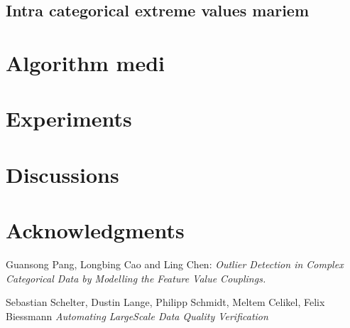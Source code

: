 \documentclass{article}
\begin{document}

\subsection{Intra categorical extreme values mariem} %
\label{sub:Intra categorical extreme values}



\section{Algorithm medi} %
\label{sec:Algorithm}




\section{Experiments} %
\label{sec:Experiments}




\section{Discussions} %
\label{sec:Discussions}




\section*{Acknowledgments} %
\label{sec:Acknowledgments}




\begin{thebibliography}{999}

    Guansong Pang, Longbing Cao and Ling Chen:
    \emph{Outlier Detection in Complex Categorical Data
        by Modelling the Feature Value Couplings.}

    Sebastian Schelter, Dustin Lange, Philipp Schmidt, Meltem Celikel, Felix Biessmann
    \emph{Automating LargeScale Data Quality Verification}


\end{thebibliography}
\end{document}
